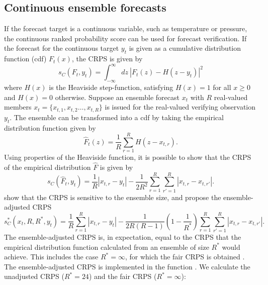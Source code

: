 \documentclass[article]{jss}\usepackage[]{graphicx}\usepackage[]{color}
\begin{document}
\subsection{Continuous ensemble forecasts}


If the forecast target is a continuous variable, such as temperature or pressure, the continuous ranked probability score \citep[CRPS;][]{matheson1976scoring} can be used for forecast verification.
If the forecast for the continuous target $y_t$ is given as a cumulative distribution function (cdf) $F_t(x)$, the CRPS is given by 
%
\begin{equation}
s_{C}(F_t, y_t) = \int_{-\infty}^\infty dz\ \left|F_t(z) - H(z-y_t)\right|^2
\label{eq:crps}
\end{equation}
%
where $H(x)$ is the Heaviside step-function, satisfying $H(x)=1$ for all $x\ge 0$ and $H(x)=0$ otherwise.
Suppose an ensemble forecast $x_t$ with $R$ real-valued members $x_t = \{x_{t,1}, x_{t,2} \dots, x_{t,R}\}$ is issued for the real-valued verifying observation $y_t$.
The ensemble can be transformed into a cdf by taking the empirical distribution function given by 
%
\begin{equation}
\hat{F}_t(z) = \frac{1}{R} \sum_{r=1}^{R} H(z - x_{t,r}).
\end{equation}
%
Using properties of the Heaviside function, it is possible to show that the CRPS of the empirical distribution $\hat{F}$ is given by
%
\begin{equation}
s_{C}(\hat{F}_t, y_t) = \frac{1}{R}|x_{t,r}-y_t| - \frac{1}{2R^2} \sum_{r=1}^R \sum_{r'=1}^R |x_{t,r}-x_{t,r'}|.
\end{equation}
%
\citet{fricker2013three} show that the CRPS is sensitive to the ensemble size, and propose the ensemble-adjusted CRPS
%
\begin{equation}
s_{C}^*(x_t, R, R^*, y_t) = \frac{1}{R}\sum_{r=1}^R |x_{t,r} - y_t| - \frac{1}{2R(R-1)}\left(1-\frac{1}{R^*}\right) \sum_{r=1}^R\sum_{r'=1}^R |x_{t,r}-x_{t,r'}|.
\end{equation}
%
The ensemble-adjusted CRPS is, in expectation, equal to the CRPS that the empirical distribution function calculated from an ensemble of size $R^*$ would achieve.
This includes the case $R^*=\infty$, for which the fair CRPS is obtained \citep{fricker2013three}.
The ensemble-adjusted CRPS is implemented in the  function .
We calculate the unadjusted CRPS ($R^*=24$) and the fair CRPS ($R^*=\infty$):
%
\end{document}
